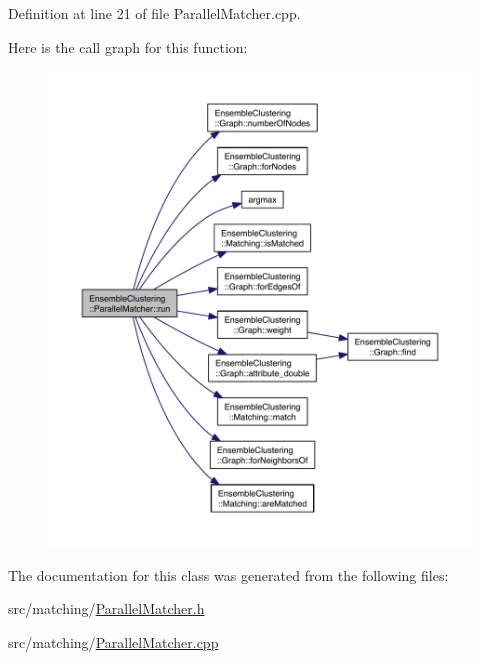 Definition at line 21 of file Parallel\-Matcher.\-cpp.



Here is the call graph for this function\-:
\nopagebreak
\begin{figure}[H]
\begin{center}
\leavevmode
\includegraphics[width=350pt]{class_ensemble_clustering_1_1_parallel_matcher_a59d01ba8833164d22ddf54f5d163d7cb_cgraph}
\end{center}
\end{figure}




The documentation for this class was generated from the following files\-:\begin{DoxyCompactItemize}
\item 
src/matching/\hyperlink{_parallel_matcher_8h}{Parallel\-Matcher.\-h}\item 
src/matching/\hyperlink{_parallel_matcher_8cpp}{Parallel\-Matcher.\-cpp}\end{DoxyCompactItemize}
